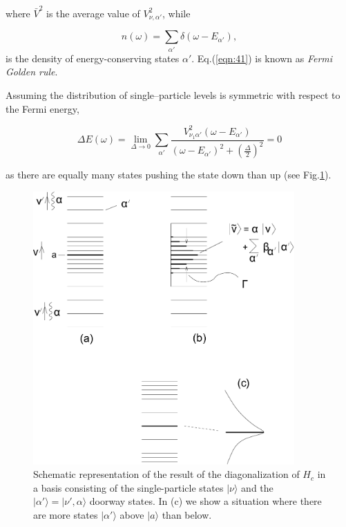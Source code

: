 \noindent where $\bar{V}^2$ is the average value of $V_{\nu ,\alpha'}^2$, while

\begin{equation}
n(\omega) = \sum_{\alpha'} \delta(\omega - E_{\alpha'}) ,
\label{eqn:42}
\end{equation}
is the density of energy-conserving states $\alpha'$. Eq.(\ref{eqn:41}) is known as {\it Fermi Golden rule}.

Assuming the distribution of single--particle levels is symmetric with respect to the Fermi energy,

\begin{equation}
\Delta E(\omega) = \lim_{\Delta \rightarrow 0} \sum_{\alpha'} \frac{V_{\nu_1 \alpha'}^2 (\omega - E_{\alpha'})}{(\omega - E_{\alpha'})^2 + \left( \frac{\Delta}{2} \right)^2} = 0
\end{equation}

\noindent as there are equally many states pushing the state down than up (see Fig.\ref{fig:4.5}).

\begin{figure}
\centerline {
\includegraphics*[width=10cm]{introduccion/figs/figintroD5}
}
\caption{Schematic representation of the result of the diagonalization of $H_{c}$ in a basis consisting of the single-particle states $|\nu \rangle$ and the $|\alpha' \rangle=|\nu', {\alpha} \rangle$ doorway states. In (c) we show a situation where there are more states $|\alpha' \rangle$ above $|a\rangle$ than below.}
\label{fig:4.5}
\end{figure}


